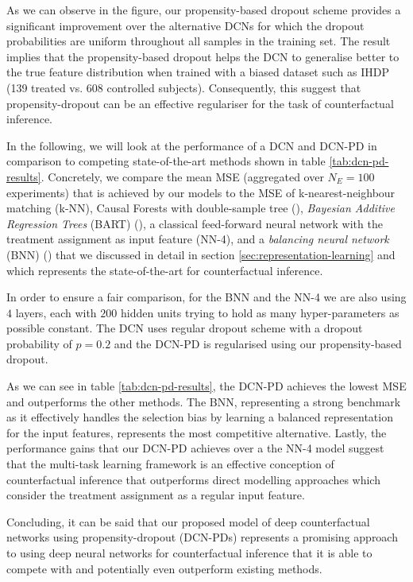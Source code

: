 As we can observe in the figure, our propensity-based dropout scheme provides a significant improvement over the alternative DCNs for which the  dropout probabilities are uniform throughout all samples in the training set. The result implies that the propensity-based dropout helps the DCN to generalise better to the true feature distribution when trained with a biased dataset such as IHDP (139 treated vs. 608 controlled subjects). Consequently, this suggest that propensity-dropout can be an effective regulariser for the task of counterfactual inference. 

In the following, we will look at the performance of a DCN and DCN-PD in comparison to competing state-of-the-art methods shown in table \ref{tab:dcn-pd-results}. Concretely, we compare the mean MSE (aggregated over $N_E = 100$ experiments) that is achieved by our models to the MSE of k-nearest-neighbour matching (k-NN), Causal Forests with double-sample tree (\cite{random-forests}),
\emph{Bayesian Additive Regression Trees} (BART) (\cite{chipman,hill}), 
a classical feed-forward neural network with the treatment assignment as input feature (NN-4),
and a \emph{balancing neural network} (BNN) (\cite{sontag-paper}) that we discussed in detail in section \ref{sec:representation-learning} and which represents the state-of-the-art for counterfactual inference. 

In order to ensure a fair comparison, for the BNN and the NN-4 we are also using $4$ layers, each with $200$ hidden units trying to hold as many hyper-parameters as possible constant. The DCN uses regular dropout scheme with a dropout probability of $p=0.2$ and the DCN-PD is regularised using our propensity-based dropout.

As we can see in table \ref{tab:dcn-pd-results}, the DCN-PD achieves the lowest MSE and outperforms the other methods. The BNN, representing  a strong benchmark as it effectively handles the selection bias by learning a balanced representation for the input features, represents the most competitive alternative. Lastly, the performance gains that our DCN-PD achieves over a the NN-4 model suggest that the multi-task learning framework is an effective conception of counterfactual inference that outperforms direct modelling approaches which consider the treatment assignment as a regular input feature.   %

Concluding, it can be said that our proposed model of deep counterfactual networks using propensity-dropout (DCN-PDs) represents a promising approach to using deep neural networks for counterfactual inference that it is able to compete with and potentially even outperform existing methods. 

